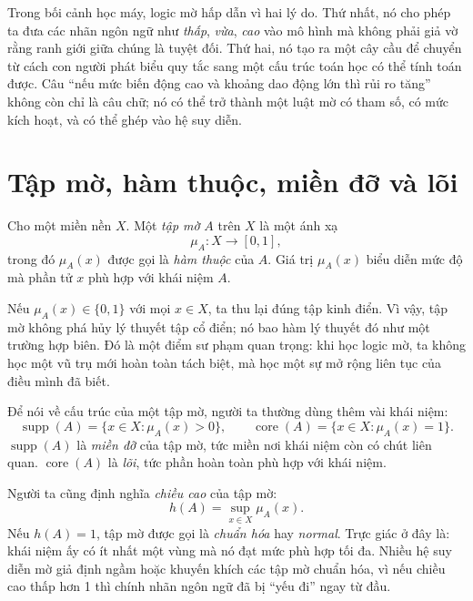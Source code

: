 Trong bối cảnh học máy, logic mờ hấp dẫn vì hai lý do. Thứ nhất, nó cho phép ta đưa các nhãn ngôn ngữ như \emph{thấp}, \emph{vừa}, \emph{cao} vào mô hình mà không phải giả vờ rằng ranh giới giữa chúng là tuyệt đối. Thứ hai, nó tạo ra một cây cầu để chuyển từ cách con người phát biểu quy tắc sang một cấu trúc toán học có thể tính toán được. Câu ``nếu mức biến động cao và khoảng dao động lớn thì rủi ro tăng'' không còn chỉ là câu chữ; nó có thể trở thành một luật mờ có tham số, có mức kích hoạt, và có thể ghép vào hệ suy diễn.

\section{Tập mờ, hàm thuộc, miền đỡ và lõi}

\begin{definition}
Cho một miền nền \(X\). Một \emph{tập mờ} \(A\) trên \(X\) là một ánh xạ
\[
\mu_A:X\to[0,1],
\]
trong đó \(\mu_A(x)\) được gọi là \emph{hàm thuộc} của \(A\). Giá trị \(\mu_A(x)\) biểu diễn mức độ mà phần tử \(x\) phù hợp với khái niệm \(A\).
\end{definition}

Nếu \(\mu_A(x)\in\{0,1\}\) với mọi \(x\in X\), ta thu lại đúng tập kinh điển. Vì vậy, tập mờ không phá hủy lý thuyết tập cổ điển; nó bao hàm lý thuyết đó như một trường hợp biên. Đó là một điểm sư phạm quan trọng: khi học logic mờ, ta không học một vũ trụ mới hoàn toàn tách biệt, mà học một sự mở rộng liên tục của điều mình đã biết.

Để nói về cấu trúc của một tập mờ, người ta thường dùng thêm vài khái niệm:
\[
\operatorname{supp}(A)=\{x\in X:\mu_A(x)>0\},
\qquad
\operatorname{core}(A)=\{x\in X:\mu_A(x)=1\}.
\]
\(\operatorname{supp}(A)\) là \emph{miền đỡ} của tập mờ, tức miền nơi khái niệm còn có chút liên quan. \(\operatorname{core}(A)\) là \emph{lõi}, tức phần hoàn toàn phù hợp với khái niệm.

Người ta cũng định nghĩa \emph{chiều cao} của tập mờ:
\[
h(A)=\sup_{x\in X}\mu_A(x).
\]
Nếu \(h(A)=1\), tập mờ được gọi là \emph{chuẩn hóa} hay \emph{normal}. Trực giác ở đây là: khái niệm ấy có ít nhất một vùng mà nó đạt mức phù hợp tối đa. Nhiều hệ suy diễn mờ giả định ngầm hoặc khuyến khích các tập mờ chuẩn hóa, vì nếu chiều cao thấp hơn 1 thì chính nhãn ngôn ngữ đã bị ``yếu đi'' ngay từ đầu.

